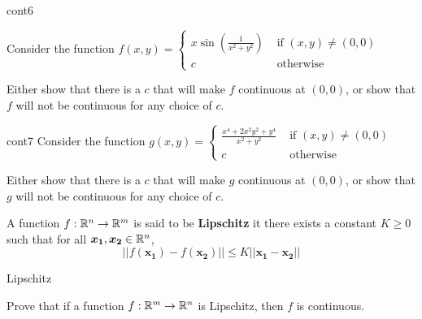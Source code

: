 \begin{problem}{cont6}

Consider the function  $f(x,y) = \left\{
		\begin{array}{ll}
			x\sin(\frac{1}{x^2 + y^2}) & \text{ if } (x,y) \neq (0,0) \\
			c & \text{ otherwise } 
		\end{array}
		\right.$
		
		Either show that there is a $c$ that will make $f$ continuous at $(0,0)$, or show that $f$ will not be continuous for any choice of $c$.

\end{problem}

\begin{problem}{cont7}
Consider the function  $g(x,y) = \left\{
		\begin{array}{ll}
			\frac{x^4  +2x^2y^2 +y^4}{x^2 + y^2} & \text{ if } (x,y) \neq (0,0) \\
			c & \text{ otherwise } 
		\end{array}
		\right.$
		
		Either show that there is a $c$ that will make $g$ continuous at $(0,0)$, or show that $g$ will not be continuous for any choice of $c$.
\end{problem}

\begin{definition}
A function $f : \mathbb{R}^n \to \mathbb{R}^m$ is said to be \textbf{Lipschitz} it there exists a constant $K \geq 0$ such that for all $\bm{x_1},\bm{x_2} \in \mathbb{R}^n$,  $$||f(\bm{x_1}) - f(\bm{x_2})|| \leq K ||\bm{x_1} - \bm{x_2}|| $$
\end{definition}

\begin{problem}{Lipschitz}

    Prove that if a function $f : \mathbb{R}^m \to \mathbb{R}^n$ is Lipschitz, then $f$ is continuous.

\end{problem}
    